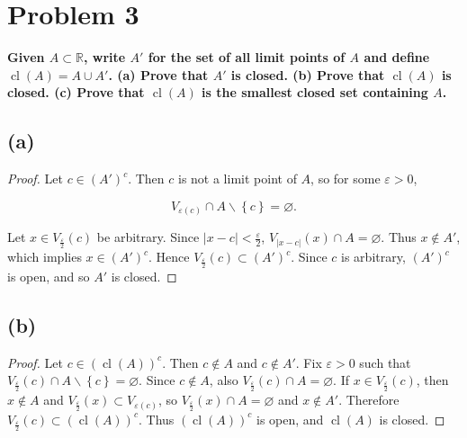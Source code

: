 \section{Problem 3}

\textbf{Given \(A \subset \mathbb{R}\), write \(A'\) for the set of all limit points of \(A\) and define \(\operatorname{cl}(A) = A \cup A'\). (a) Prove that \(A'\) is closed. (b) Prove that \(\operatorname{cl}(A)\) is closed. (c) Prove that \(\operatorname{cl}(A)\) is the smallest closed set containing \(A\).}

\subsection{(a)}

\begin{proof}

Let \(c \in \left( A' \right)^{c}\). Then \(c\) is not a limit point of \(A\), so for some \(\varepsilon > 0\),

\[V_{\varepsilon{(c)}} \cap A \smallsetminus \left\{ c \right\} = \varnothing.\]

Let \(x \in V_{\frac{\varepsilon}{2}}(c)\) be arbitrary. Since \(\left| {x - c} \right| < \frac{\varepsilon}{2}\), \(V_{|{x - c}|}(x) \cap A = \varnothing\). Thus \(x \notin A'\), which implies \(x \in \left( A' \right)^{c}\). Hence \(V_{\frac{\varepsilon}{2}}(c) \subset \left( A' \right)^{c}\). Since \(c\) is arbitrary, \(\left( A' \right)^{c}\) is open, and so \(A'\) is closed.

\end{proof}

\subsection{(b)}

\begin{proof}

Let \(c \in \left( {\operatorname{cl}(A)} \right)^{c}\). Then \(c \notin A\) and \(c \notin A'\). Fix \(\varepsilon > 0\) such that \(V_{\frac{\varepsilon}{2}}(c) \cap A \smallsetminus \left\{ c \right\} = \varnothing\). Since \(c \notin A\), also \(V_{\frac{\varepsilon}{2}}(c) \cap A = \varnothing\). If \(x \in V_{\frac{\varepsilon}{2}}(c)\), then \(x \notin A\) and \(V_{\frac{\varepsilon}{2}}(x) \subset V_{\varepsilon{(c)}}\), so \(V_{\frac{\varepsilon}{2}}(x) \cap A = \varnothing\) and \(x \notin A'\). Therefore \(V_{\frac{\varepsilon}{2}}(c) \subset \left( {\operatorname{cl}(A)} \right)^{c}\). Thus \(\left( {\operatorname{cl}(A)} \right)^{c}\) is open, and \(\operatorname{cl}(A)\) is closed.

\end{proof}

